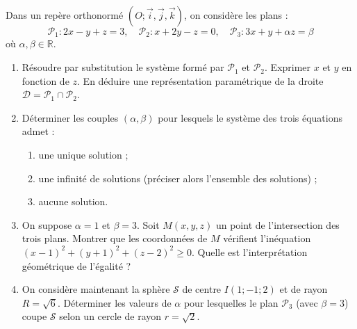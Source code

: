 \documentclass[11pt]{article}
\begin{document}
\begin{exercice}
Dans un repère orthonormé $(O; \vec{i}, \vec{j}, \vec{k})$, on considère les plans :
\[
\mathcal{P}_1 : 2x - y + z = 3,\quad \mathcal{P}_2 : x + 2y - z = 0,\quad \mathcal{P}_3 : 3x + y + \alpha z = \beta
\]
où $\alpha, \beta \in \mathbb{R}$.
\begin{enumerate}
    \item Résoudre par substitution le système formé par $\mathcal{P}_1$ et $\mathcal{P}_2$. Exprimer $x$ et $y$ en fonction de $z$. En déduire une représentation paramétrique de la droite $\mathcal{D} = \mathcal{P}_1 \cap \mathcal{P}_2$.
    \item Déterminer les couples $(\alpha, \beta)$ pour lesquels le système des trois équations admet :
    \begin{enumerate}
        \item une unique solution ;
        \item une infinité de solutions (préciser alors l'ensemble des solutions) ;
        \item aucune solution.
    \end{enumerate}
    \item On suppose $\alpha = 1$ et $\beta = 3$. Soit $M(x,y,z)$ un point de l'intersection des trois plans. Montrer que les coordonnées de $M$ vérifient l'inéquation $(x-1)^2 + (y+1)^2 + (z-2)^2 \geq 0$. Quelle est l'interprétation géométrique de l'égalité ?
    \item On considère maintenant la sphère $\mathcal{S}$ de centre $I(1; -1; 2)$ et de rayon $R = \sqrt{6}$. Déterminer les valeurs de $\alpha$ pour lesquelles le plan $\mathcal{P}_3$ (avec $\beta = 3$) coupe $\mathcal{S}$ selon un cercle de rayon $r = \sqrt{2}$.
\end{enumerate}
\end{exercice}
\end{document}
